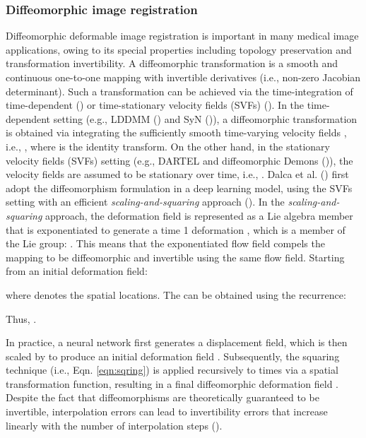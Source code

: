 \documentclass[times,twocolumn,final]{elsarticle}
\begin{document}
\subsubsection{Diffeomorphic image registration}
\label{sec:ss_diff}
Diffeomorphic deformable image registration is important in many medical image applications, owing to its special properties including topology preservation and transformation invertibility. A diffeomorphic transformation is a smooth and continuous one-to-one mapping with invertible derivatives (i.e., non-zero Jacobian determinant). Such a transformation can be achieved via the time-integration of time-dependent (\cite{beg2005computing, avants2008symmetric}) or time-stationary velocity fields (SVFs) (\cite{arsigny2006log, ashburner2007fast, vercauteren2009diffeomorphic, hernandez2009registration}). In the time-dependent setting (e.g., LDDMM (\cite{beg2005computing}) and SyN (\cite{avants2008symmetric})), a diffeomorphic transformation  is obtained via integrating the sufficiently smooth time-varying velocity fields , i.e., , where  is the identity transform. On the other hand, in the stationary velocity fields (SVFs) setting (e.g., DARTEL \cite{ashburner2007fast} and diffeomorphic Demons (\cite{vercauteren2009diffeomorphic})), the velocity fields are assumed to be stationary over time, i.e., . Dalca et al. (\cite{dalca2019unsupervised}) first adopt the diffeomorphism formulation in a deep learning model, using the SVFs setting with an efficient \textit{scaling-and-squaring} approach (\cite{arsigny2006log}). In the \textit{scaling-and-squaring} approach, the deformation field is represented as a Lie algebra member that is exponentiated to generate a time 1 deformation , which is a member of the Lie group: . This means that the exponentiated flow field compels the mapping to be diffeomorphic and invertible using the same flow field. Starting from an initial deformation field:
\begin{linenomath}

\end{linenomath}
where  denotes the spatial locations. The  can be obtained using the recurrence:
\begin{linenomath}

\end{linenomath}
Thus, .

In practice, a neural network first generates a displacement field, which is then scaled by  to produce an initial deformation field . Subsequently, the squaring technique (i.e., Eqn. \ref{eqn:sqring}) is applied recursively to   times via a spatial transformation function, resulting in a final diffeomorphic deformation field . Despite the fact that diffeomorphisms are theoretically guaranteed to be invertible, interpolation errors can lead to invertibility errors that increase linearly with the number of interpolation steps (\cite{avants2008symmetric, mok2020fast}).
\end{document}
